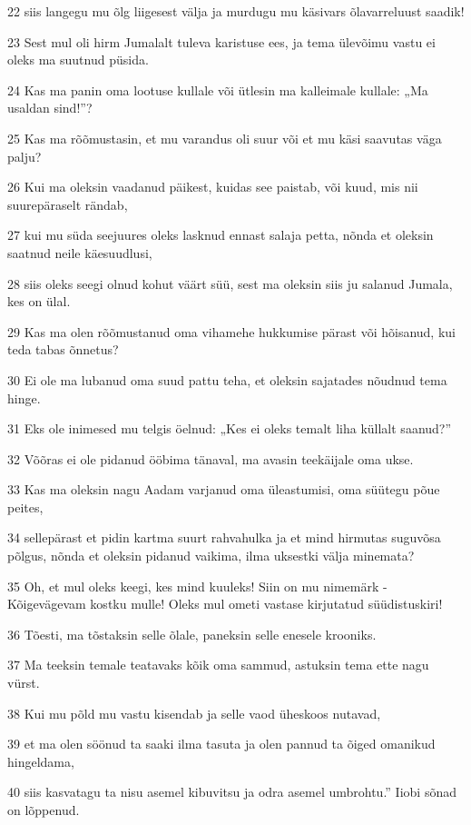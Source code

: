 \par 22 siis langegu mu õlg liigesest välja ja murdugu mu käsivars õlavarreluust saadik!
\par 23 Sest mul oli hirm Jumalalt tuleva karistuse ees, ja tema ülevõimu vastu ei oleks ma suutnud püsida.
\par 24 Kas ma panin oma lootuse kullale või ütlesin ma kalleimale kullale: „Ma usaldan sind!”?
\par 25 Kas ma rõõmustasin, et mu varandus oli suur või et mu käsi saavutas väga palju?
\par 26 Kui ma oleksin vaadanud päikest, kuidas see paistab, või kuud, mis nii suurepäraselt rändab,
\par 27 kui mu süda seejuures oleks lasknud ennast salaja petta, nõnda et oleksin saatnud neile käesuudlusi,
\par 28 siis oleks seegi olnud kohut väärt süü, sest ma oleksin siis ju salanud Jumala, kes on ülal.
\par 29 Kas ma olen rõõmustanud oma vihamehe hukkumise pärast või hõisanud, kui teda tabas õnnetus?
\par 30 Ei ole ma lubanud oma suud pattu teha, et oleksin sajatades nõudnud tema hinge.
\par 31 Eks ole inimesed mu telgis öelnud: „Kes ei oleks temalt liha küllalt saanud?”
\par 32 Võõras ei ole pidanud ööbima tänaval, ma avasin teekäijale oma ukse.
\par 33 Kas ma oleksin nagu Aadam varjanud oma üleastumisi, oma süütegu põue peites,
\par 34 sellepärast et pidin kartma suurt rahvahulka ja et mind hirmutas suguvõsa põlgus, nõnda et oleksin pidanud vaikima, ilma uksestki välja minemata?
\par 35 Oh, et mul oleks keegi, kes mind kuuleks! Siin on mu nimemärk - Kõigevägevam kostku mulle! Oleks mul ometi vastase kirjutatud süüdistuskiri!
\par 36 Tõesti, ma tõstaksin selle õlale, paneksin selle enesele krooniks.
\par 37 Ma teeksin temale teatavaks kõik oma sammud, astuksin tema ette nagu vürst.
\par 38 Kui mu põld mu vastu kisendab ja selle vaod üheskoos nutavad,
\par 39 et ma olen söönud ta saaki ilma tasuta ja olen pannud ta õiged omanikud hingeldama,
\par 40 siis kasvatagu ta nisu asemel kibuvitsu ja odra asemel umbrohtu.” Iiobi sõnad on lõppenud.

